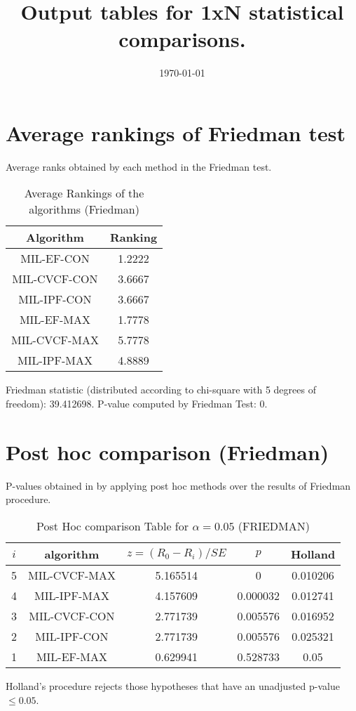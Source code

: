 \documentclass[a4paper,10pt]{article}
\title{Output tables for 1xN statistical comparisons.}
\author{}
\date{\today}
\begin{document}
\begin{landscape}
\pagestyle{empty}
\maketitle
\thispagestyle{empty}

\section{Average rankings of Friedman test}


Average ranks obtained by each method in the Friedman test.

\begin{table}[!htp]
\centering
\begin{tabular}{|c|c|}\hline
Algorithm&Ranking\\\hline
MIL-EF-CON&1.2222\\MIL-CVCF-CON&3.6667\\MIL-IPF-CON&3.6667\\MIL-EF-MAX&1.7778\\MIL-CVCF-MAX&5.7778\\MIL-IPF-MAX&4.8889\\\hline\end{tabular}
\caption{Average Rankings of the algorithms (Friedman)}
\end{table}

Friedman statistic (distributed according to chi-square with 5 degrees of freedom): 39.412698. \newline P-value computed by Friedman Test: 0.\newline


\newpage

\section{Post hoc comparison (Friedman)}


P-values obtained in by applying post hoc methods over the results of Friedman procedure.

\begin{table}[!htp]
\centering\footnotesize
\begin{tabular}{ccccc}
$i$&algorithm&$z=(R_0 - R_i)/SE$&$p$&Holland\\
\hline5&MIL-CVCF-MAX&5.165514&0&0.010206\\4&MIL-IPF-MAX&4.157609&0.000032&0.012741\\3&MIL-CVCF-CON&2.771739&0.005576&0.016952\\2&MIL-IPF-CON&2.771739&0.005576&0.025321\\1&MIL-EF-MAX&0.629941&0.528733&0.05\\\hline
\end{tabular}
\caption{Post Hoc comparison Table for $\alpha=0.05$ (FRIEDMAN)}
\end{table}Holland's procedure rejects those hypotheses that have an unadjusted p-value $\le0.05$.



\end{landscape}
\end{document}
